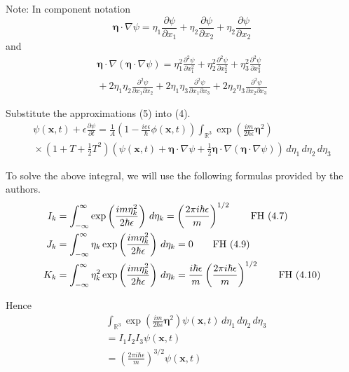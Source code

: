 \documentclass[12pt]{article}
\newcommand\INT{\int_{\mathbb R^3}}
\begin{document}
Note: In component notation
\begin{equation*}
\boldsymbol\eta\cdot\nabla\psi=
\eta_1\frac{\partial\psi}{\partial x_1}+
\eta_2\frac{\partial\psi}{\partial x_2}+
\eta_2\frac{\partial\psi}{\partial x_2}
\end{equation*}
and
\begin{multline*}
\boldsymbol\eta\cdot\nabla(\boldsymbol\eta\cdot\nabla\psi)=
\eta_1^2\frac{\partial^2\psi}{\partial x_1^2}
+\eta_2^2\frac{\partial^2\psi}{\partial x_2^2}
+\eta_3^2\frac{\partial^2\psi}{\partial x_3^2}
\\
{}+2\eta_1\eta_2\frac{\partial^2\psi}{\partial x_1\partial x_2}
+2\eta_1\eta_3\frac{\partial^2\psi}{\partial x_1\partial x_3}
+2\eta_2\eta_3\frac{\partial^2\psi}{\partial x_2\partial x_3}
\end{multline*}

Substitute the approximations (5) into (4).
\begin{multline*}
\psi(\mathbf x,t)+\epsilon\frac{\partial\psi}{\partial t}=
\frac{1}{A}
\left(1-\frac{ie\epsilon}{\hbar}\phi\left(\mathbf x,t\right)\right)
\INT\exp\left(\frac{im}{2\hbar\epsilon}\boldsymbol\eta^2\right)
\\
{}\times
\left(1+T+\tfrac{1}{2}T^2\right)
\left(\psi(\mathbf x,t)+\boldsymbol\eta\cdot\nabla\psi
+\tfrac{1}{2}\boldsymbol\eta\cdot\nabla(\boldsymbol\eta\cdot\nabla\psi)\right)
\,d\eta_1\,d\eta_2\,d\eta_3
\tag{6}
\end{multline*}

To solve the above integral, we will use the following formulas provided by the authors.
\begin{align*}
I_k&=\int_{-\infty}^\infty\exp\left(\frac{im\eta_k^2}{2\hbar\epsilon}\right)\,d\eta_k
=\left(\frac{2\pi i\hbar\epsilon}{m}\right)^{1/2}
\tag*{\text{FH (4.7)}}
\\
J_k&=\int_{-\infty}^\infty\eta_k\exp\left(\frac{im\eta_k^2}{2\hbar\epsilon}\right)\,d\eta_k
=0
\tag*{\text{FH (4.9)}}
\\
K_k&=\int_{-\infty}^\infty\eta_k^2\exp\left(\frac{im\eta_k^2}{2\hbar\epsilon}\right)\,d\eta_k
=\frac{i\hbar\epsilon}{m}\left(\frac{2\pi i\hbar\epsilon}{m}\right)^{1/2}
\tag*{\text{FH (4.10)}}
\end{align*}

Hence
\begin{align*}
&
\INT\exp\left(\frac{im}{2\hbar\epsilon}\boldsymbol\eta^2\right)\psi(\mathbf x,t)
\,d\eta_1\,d\eta_2\,d\eta_3
\\
&{}=I_1 I_2 I_3 \psi(\mathbf x,t)
\\
&{}=\left(\frac{2\pi i\hbar\epsilon}{m}\right)^{3/2}\psi(\mathbf x,t)
\tag{7}
\end{align*}
\end{document}
